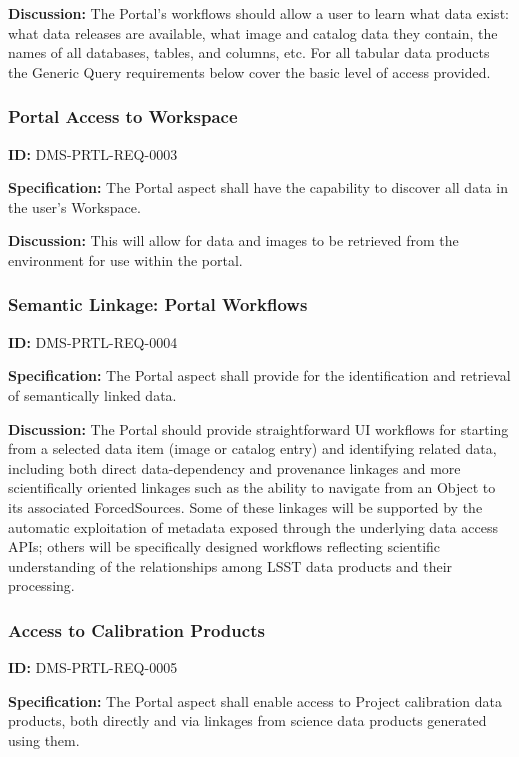\documentclass[SE,toc,lsstdraft]{lsstdoc}
\begin{document}
\textbf{Discussion:}
The Portal's workflows should allow a user to learn what data exist: what data releases are available, what image and catalog data they contain, the names of all databases, tables, and columns, etc.
For all tabular data products the Generic Query requirements below cover the basic level of access provided.

\subsubsection{Portal Access to Workspace}

\label{DMS-PRTL-REQ-0003}
\textbf{ID:} DMS-PRTL-REQ-0003

\textbf{Specification:}
The Portal aspect shall have the capability to discover all data in the user's Workspace.

\textbf{Discussion:}
This will allow for data and images to be retrieved from the environment for use within the portal.

\subsubsection{Semantic Linkage: Portal Workflows}

\label{DMS-PRTL-REQ-0004}
\textbf{ID:} DMS-PRTL-REQ-0004

\textbf{Specification:}
The Portal aspect shall provide for the identification and retrieval of semantically linked data.

\textbf{Discussion:}
The Portal should provide straightforward UI workflows for starting from a selected data item (image or catalog entry) and identifying related data, including both direct data-dependency and provenance linkages and more scientifically oriented linkages such as the ability to navigate from an Object to its associated ForcedSources.
Some of these linkages will be supported by the automatic exploitation of metadata exposed through the underlying data access APIs; others will be specifically designed workflows reflecting scientific understanding of the relationships among LSST data products and their processing.

\subsubsection{Access to Calibration Products}

\label{DMS-PRTL-REQ-0005}
\textbf{ID:} DMS-PRTL-REQ-0005

\textbf{Specification:}
The Portal aspect shall enable access to Project calibration data products, both directly and via linkages from science data products generated using them.
\end{document}
